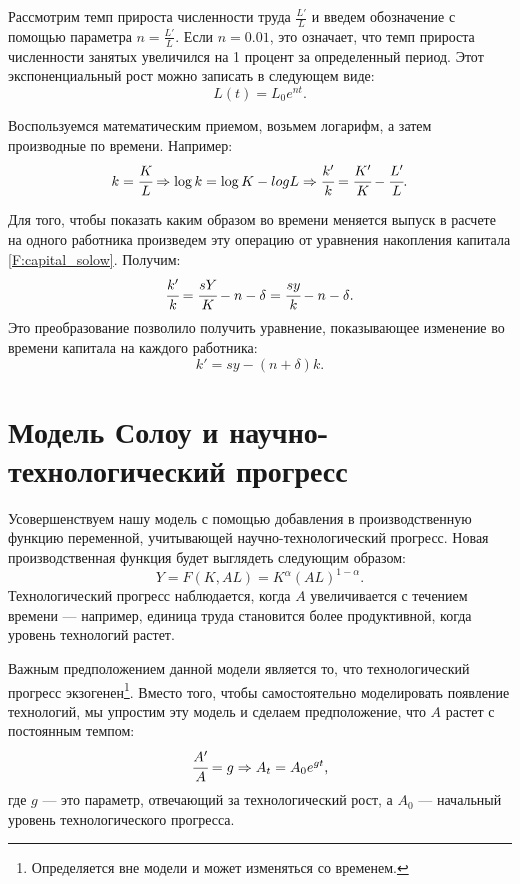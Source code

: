 Рассмотрим темп прироста численности труда $\frac{L'}{L}$ и введем обозначение с помощью параметра $n = \frac{L'}{L}$.
Если $n = 0.01$, это означает, что темп прироста численности занятых увеличился на 1 процент за определенный период.
Этот экспоненциальный рост можно записать в следующем виде:
\begin{equation*}
	L(t) = L_{0}e^{nt}\text{.}
\end{equation*}

Воспользуемся математическим приемом, возьмем логарифм, а затем производные по времени.
Например:
\begin{equation*}
	k = \cfrac{K}{L}\Rightarrow \log{k}=\log{K} - log{L} \Rightarrow \cfrac{k'}{k} = \cfrac{K'}{K} - \cfrac{L'}{L}\text{.}
\end{equation*}

Для того, чтобы показать каким образом во времени меняется выпуск в расчете на одного работника произведем эту операцию от уравнения накопления капитала \ref{F:capital_solow}.
Получим:
\begin{equation*}
\cfrac{k'}{k} = \cfrac{sY}{K} - n - \delta = \cfrac{sy}{k} - n - \delta\text{.}
\end{equation*}
Это преобразование позволило получить уравнение, показывающее изменение во времени капитала на каждого работника:
\begin{equation*}
k'=sy-(n + \delta)k\text{.}
\end{equation*}

\section{Модель Солоу и научно-технологический прогресс}

Усовершенствуем нашу модель с помощью добавления в производственную функцию переменной, учитывающей научно-технологический прогресс.
Новая производственная функция будет выглядеть следующим образом:
\begin{equation}
	Y=F(K,AL)=K^{\alpha}(AL)^{1 - \alpha}\text{.}
\label{F:Cob_dogl_tech}
\end{equation}
Технологический прогресс наблюдается, когда $A$ увеличивается с течением времени --- например, единица труда становится более продуктивной, когда уровень технологий растет.

Важным предположением данной модели является то, что технологический прогресс экзогенен\footnote{Определяется вне модели и может изменяться со временем.}.
Вместо того, чтобы самостоятельно моделировать появление технологий, мы упростим эту модель и сделаем предположение, что $A$ растет с постоянным темпом:
\begin{equation*}
	\cfrac{A'}{A} = g \Rightarrow A_{t} = A_{0} e^{gt}\text{,}
\end{equation*}
где $g$ --- это параметр, отвечающий за технологический рост, а $A_0$ --- начальный уровень технологического прогресса.

